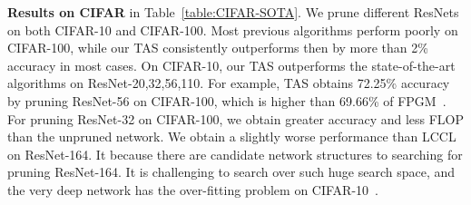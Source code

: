 \documentclass{article}
\def\Tabref#1{Table~\ref{#1}}
\def\NAME{{TAS}}
\begin{document}
\textbf{Results on CIFAR} in \Tabref{table:CIFAR-SOTA}.
We prune different ResNets on both CIFAR-10 and CIFAR-100.
Most previous algorithms perform poorly on CIFAR-100, while our {\NAME} consistently outperforms then by more than 2\% accuracy in most cases.
On CIFAR-10, our {\NAME} outperforms the state-of-the-art algorithms on ResNet-20,32,56,110.
For example, {\NAME} obtains 72.25\% accuracy by pruning ResNet-56 on CIFAR-100, which is higher than 69.66\% of FPGM~\cite{he2019pruning}.
For pruning ResNet-32 on CIFAR-100, we obtain greater accuracy and less FLOP than the unpruned network.
We obtain a slightly worse performance than LCCL~\cite{dong2017more} on ResNet-164.
It because there are  candidate network structures to searching for pruning ResNet-164. It is challenging to search over such huge search space, and the very deep network has the over-fitting problem on CIFAR-10~\cite{he2016deep}.
\end{document}
